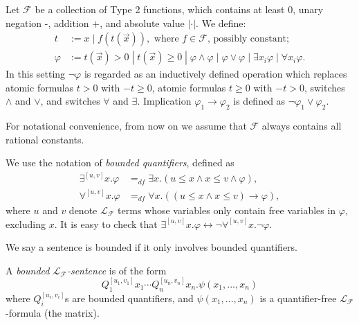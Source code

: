 \documentclass[prodmode]{acmsmall} %
\begin{document}
\begin{definition}
Let $\mathcal{F}$ be a collection of Type 2 functions, which contains at least $0$, unary negation -, addition $+$, and absolute value $|\cdot|$. We define:
\begin{align*}
t& := x \; | \; f(t(\vec x)), \mbox{ where }f\in \mathcal{F}\mbox{, possibly constant};\\
\varphi& := t(\vec x)> 0 \; | \; t(\vec x)\geq 0 \; | \; \varphi\wedge\varphi \; | \; \varphi\vee\varphi \; | \; \exists x_i\varphi \; |\; \forall x_i\varphi.
\end{align*}
In this setting $\neg\varphi$ is regarded as an inductively defined operation which replaces atomic formulas $t>0$ with $-t\geq 0$, atomic formulas $t\geq 0$ with $-t>0$, switches $\wedge$ and $\vee$, and switches $\forall$ and $\exists$. Implication $\varphi_1\rightarrow\varphi_2$ is defined as $\neg\varphi_1\vee\varphi_2$.
\end{definition}

For notational convenience, from now on we assume that $\mathcal{F}$ always contains all rational constants. 

\begin{definition}
We use the notation of {\em bounded quantifiers}, defined as
\begin{align*}
\exists^{[u,v]}x.\varphi &=_{df}\exists x. ( u \leq x \land x \leq v \wedge \varphi),\\
\forall^{[u,v]}x.\varphi &=_{df} \forall x. ( (u \leq x \land x \leq v) \rightarrow \varphi),
\end{align*}
where $u$ and $v$ denote $\mathcal{L}_{\mathcal{F}}$ terms whose variables only contain free variables in $\varphi$, excluding $x$. It is easy to check that $\exists^{[u,v]}x. \varphi \leftrightarrow \neg \forall^{[u,v]}x. \neg\varphi$. 
\end{definition}

We say a sentence is bounded if it only involves bounded quantifiers. 

\begin{definition}
A {\em bounded $\mathcal{L}_{\mathcal{F}}$-sentence} is of the form
$$Q_1^{[u_1,v_1]}x_1\cdots Q_n^{[u_n,v_n]}x_n. \psi(x_1,...,x_n)$$
where $Q_i^{[u_i,v_i]}$s are bounded quantifiers, and $\psi(x_1,...,x_n)$ is a quantifier-free $\mathcal{L}_{\mathcal{F}}$-formula (the matrix). 
\end{definition}
\end{document}
